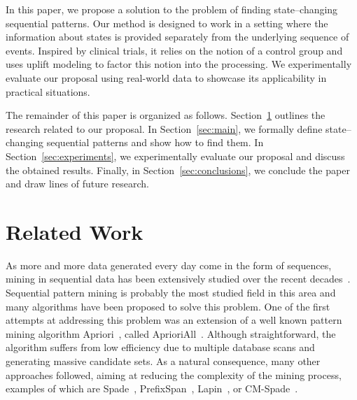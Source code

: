 \documentclass[runningheads,a4paper]{llncs}
\begin{document}
In this paper, we propose a solution to the problem of finding state--changing sequential patterns.
Our method is designed to work in a setting where the information about states is provided separately from the underlying sequence of events.
Inspired by clinical trials, it relies on the notion of a control group and uses uplift modeling to factor this notion into the processing.
We experimentally evaluate our proposal using real-world data to showcase its applicability in practical situations.

The remainder of this paper is organized as follows.
Section~\ref{sec:related} outlines the research related to our proposal.
In Section~\ref{sec:main}, we formally define state--changing sequential patterns and show how to find them.
In Section~\ref{sec:experiments}, we experimentally evaluate our proposal and discuss the obtained results.
Finally, in Section~\ref{sec:conclusions}, we conclude the paper and draw lines of future research.

\section{Related Work}
\label{sec:related}
As more and more data generated every day come in the form of sequences, mining in sequential data has been extensively studied over the recent decades~\cite{Dong:2009,Fournier:2017}.
Sequential pattern mining is probably the most studied field in this area and many algorithms have been proposed to solve this problem.
One of the first attempts at addressing this problem was an extension of a well known pattern mining algorithm Apriori~\cite{Agrawal:1994}, called AprioriAll~\cite{Agrawal:1995}.
Although straightforward, the algorithm suffers from low efficiency due to multiple database scans and generating massive candidate sets.
As a natural consequence, many other approaches followed, aiming at reducing the complexity of the mining process, examples of which are Spade~\cite{Zaki:2001}, PrefixSpan~\cite{Pei:2004}, Lapin~\cite{Yang:2007}, or CM-Spade~\cite{Fournier:2014}.
\end{document}
